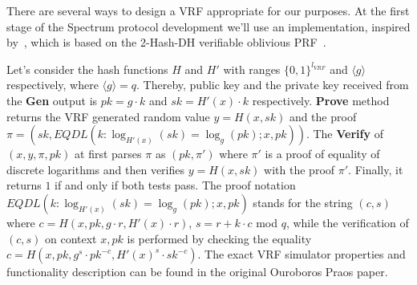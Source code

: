 There are several ways to design a VRF appropriate for our purposes.
At the first stage of the Spectrum protocol development we'll use an implementation, inspired by~\cite{cryptoeprint:2017/573}, which is based on the 2-Hash-DH verifiable oblivious PRF~\cite{asiacrypt:2014/233}.

Let's consider the hash functions $H$ and $H'$  with ranges $\{0,1\}^{l_{VRF}}$ and ${\langle g \rangle}$ respectively, where ${\langle g \rangle = q}$.
Thereby, public key and the private key received from the \textbf{Gen} output is ${pk = g \cdot k}$ and ${sk = H'(x) \cdot k}$ respectively.
\textbf{Prove} method returns the VRF generated random value ${y = H(x, sk)}$ and the proof ${\pi = (sk, EQDL(k : \log_{H'(x)}(sk) = \log_{g}(pk); x, pk))}$.
The \textbf{Verify} of ${(x, y, \pi, pk)}$ at first parses $\pi$ as ${(pk, \pi')}$ where $\pi'$ is a proof of equality of discrete logarithms and then verifies ${y = H(x, sk)}$ with the proof $\pi'$.
Finally, it returns $1$ if and only if both tests pass.
The proof notation ${EQDL(k : \log_{H'(x)}(sk) = \log_{g}(pk); x, pk)}$ stands for the string ${(c, s)}$ where $c = H(x, pk, g \cdot r, H'(x) \cdot r)$, ${s = r + k \cdot c}$ mod $q$, while the verification of ${(c, s)}$ on context ${x, pk}$ is performed by checking the equality
${c = H(x, pk, g^s \cdot pk^{-c}, H'(x)^s \cdot sk^{-c})}$.
The exact VRF simulator properties and functionality description can be found in the original Ouroboros Praos paper.

